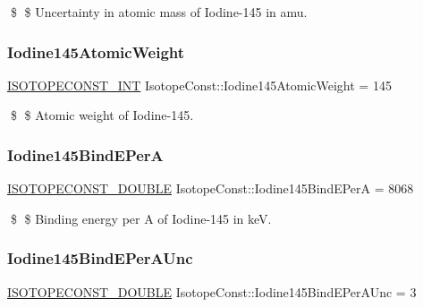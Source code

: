 \$ \$ Uncertainty in atomic mass of Iodine-\/145 in amu. \mbox{\label{group___isotope_const-_iodine-_i145_ga7cd8212733b4a80c68896ba0a40a1b26}} 
\subsubsection{\texorpdfstring{Iodine145\+Atomic\+Weight}{Iodine145AtomicWeight}}
{\footnotesize\ttfamily \mbox{\hyperlink{group___isotope_const-_macros_ga5f18360b3e99483a35c32d789e62621c}{I\+S\+O\+T\+O\+P\+E\+C\+O\+N\+S\+T\+\_\+\+I\+NT}} Isotope\+Const\+::\+Iodine145\+Atomic\+Weight = 145}

\$ \$ Atomic weight of Iodine-\/145. \mbox{\label{group___isotope_const-_iodine-_i145_ga7871247444dbc1810634f71a46bac467}} 
\subsubsection{\texorpdfstring{Iodine145\+Bind\+E\+PerA}{Iodine145BindEPerA}}
{\footnotesize\ttfamily \mbox{\hyperlink{group___isotope_const-_macros_ga8f45a7272ce02c0b4c65c44636ed719a}{I\+S\+O\+T\+O\+P\+E\+C\+O\+N\+S\+T\+\_\+\+D\+O\+U\+B\+LE}} Isotope\+Const\+::\+Iodine145\+Bind\+E\+PerA = 8068}

\$ \$ Binding energy per A of Iodine-\/145 in keV. \mbox{\label{group___isotope_const-_iodine-_i145_ga5cbee202077a2c8fc3284cd512c29cba}} 
\subsubsection{\texorpdfstring{Iodine145\+Bind\+E\+Per\+A\+Unc}{Iodine145BindEPerAUnc}}
{\footnotesize\ttfamily \mbox{\hyperlink{group___isotope_const-_macros_ga8f45a7272ce02c0b4c65c44636ed719a}{I\+S\+O\+T\+O\+P\+E\+C\+O\+N\+S\+T\+\_\+\+D\+O\+U\+B\+LE}} Isotope\+Const\+::\+Iodine145\+Bind\+E\+Per\+A\+Unc = 3}

